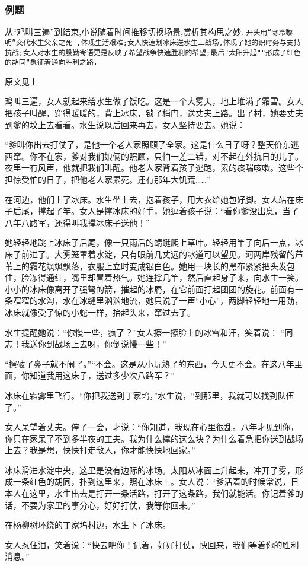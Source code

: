 \documentclass{ctexart}
\newcommand{\nm}{\normalsize}
\renewcommand{\\}{\par}
\begin{document}
\subsubsection{例题}
从``鸡叫三遍''到结束,小说随着时间推移切换场景,赏析其构思之妙.
\texttt{开头用``寒冷黎明''交代水生父亲之死 ,体现生活艰难;女人快速划冰床送水生上战场,体现了她的识时务与支持抗战;女人对水生的殷勤寄语更是反映了希望战争快速胜利的希望;最后"太阳升起""形成了红色的胡同"象征着通向胜利之路.}
\nm \fangsong
\\\centerline{原文见上}
\\鸡叫三遍，女人就起来给水生做了饭吃。这是一个大雾天，地上堆满了霜雪。女人把孩子叫醒，穿得暖暖的，背上冰床，锁了梢门，送丈夫上路。出了村，她要丈夫到爹的坟上去看看。水生说以后回来再去，女人坚持要去。她说：\\“爹叫你出去打仗了，是他一个老人家照顾了全家。这是什么日子呀？整天价东逃西窜。你不在家，爹对我们娘俩的照顾，只怕一差二错，对不起在外抗日的儿子。夜里一有风声，他就把我们叫醒。他老人家背着孩子逃跑，累的痰喘咳嗽。这些个担惊受怕的日子，把他老人家累死。还有那年大饥荒……”
\\在河边，他们上了冰床。水生坐上去，抱着孩子，用大衣给她包好脚。女人站在床子后尾，撑起了竿。女人是撑冰床的好手，她逗着孩子说：“看你爹没出息，当了八年八路军，还得叫我撑冰床子送他！”\\她轻轻地跳上冰床子后尾，像一只雨后的蜻蜓爬上草叶。轻轻用竿子向后一点，冰床子前进了。大雾笼罩着水淀，只有眼前几丈远的冰道可以望见。河两岸残留的芦苇上的霜花飒飒飘落，衣服上立时变成银白色。她用一块长的黑布紧紧把头发包住，脸冻得通红，嘴里却冒着热气。她连撑几竿，然后直起身子来，向水生一笑。小小的冰床像离开了强弩的箭，摧起的冰屑，在它前面打起团团的旋花。前面有一条窄窄的水沟，水在冰缝里汹汹地流，她只说了一声“小心”，两脚轻轻地一用劲，冰床就像受了惊的小蛇一样，抬起头来，窜过去了。\\水生提醒她说：“你慢一些，疯了？”女人擦一擦脸上的冰雪和汗，笑着说： “同志！我送你到战场上去呀，你倒说慢一些！”\\“擦破了鼻子就不闹了。”“不会。这是从小玩熟了的东西，今天更不会。在这八年里面，你知道我用这床子，送过多少次八路军？”\\冰床在霜雾里飞行。“你把我送到丁家坞，”水生说，“到那里，我就可以找到队伍了。”\\女人呆望着丈夫。停了一会，才说：“你知道，我现在心里很乱。八年才见到你，你只在家呆了不到多半夜的工夫。我为什么撑的这么块？为什么着急把你送到战场上去？我是想，快快打走敌人，你才能快快地回家。”\\冰床滑进水淀中央，这里是没有边际的冰场。太阳从冰面上升起来，冲开了雾，形成一条红色的胡同，扑到这里来，照在冰床上。女人说：“爹活着的时候常说，日本人在这里，水生出去是打开一条活路，打开了这条路，我们就能活。你记着爹的话，不要为家里的事分心，好好打仗，我等你回来。”\\在杨柳树环绕的丁家坞村边，水生下了冰床。\\女人忍住泪，笑着说：“快去吧你！记着，好好打仗，快回来，我们等着你的胜利消息。”
\songti
\end{document}

